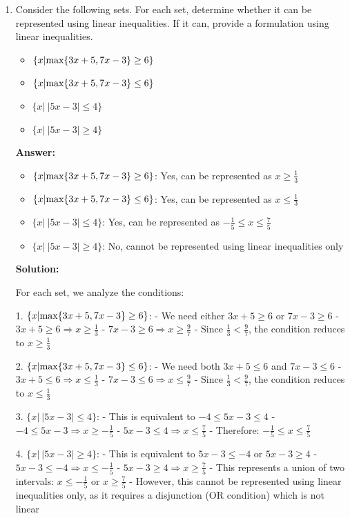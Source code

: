 \documentclass[11pt]{article}
\begin{document}
\begin{enumerate}
\item Consider the following sets. For each set, determine whether it can be represented using linear inequalities. If it can, provide a formulation using linear inequalities.
\begin{itemize}
\item $\{x | \textup{max}\{ 3x + 5, 7x - 3\} \geq 6\}$
\item $\{x | \textup{max}\{ 3x + 5, 7x - 3\} \leq 6\}$
\item $\{x| \ |5x -3| \leq 4\}$
\item $\{x| \ |5x -3| \geq 4\}$
\end{itemize}

\textbf{Answer:}

\begin{itemize}
\item $\{x | \textup{max}\{ 3x + 5, 7x - 3\} \geq 6\}$: Yes, can be represented as $x \geq \frac{1}{3}$
\item $\{x | \textup{max}\{ 3x + 5, 7x - 3\} \leq 6\}$: Yes, can be represented as $x \leq \frac{1}{3}$
\item $\{x| \ |5x -3| \leq 4\}$: Yes, can be represented as $-\frac{1}{5} \leq x \leq \frac{7}{5}$
\item $\{x| \ |5x -3| \geq 4\}$: No, cannot be represented using linear inequalities only
\end{itemize}

\textbf{Solution:}

For each set, we analyze the conditions:

1. $\{x | \textup{max}\{ 3x + 5, 7x - 3\} \geq 6\}$: 
   - We need either $3x + 5 \geq 6$ or $7x - 3 \geq 6$
   - $3x + 5 \geq 6 \Rightarrow x \geq \frac{1}{3}$
   - $7x - 3 \geq 6 \Rightarrow x \geq \frac{9}{7}$
   - Since $\frac{1}{3} < \frac{9}{7}$, the condition reduces to $x \geq \frac{1}{3}$

2. $\{x | \textup{max}\{ 3x + 5, 7x - 3\} \leq 6\}$:
   - We need both $3x + 5 \leq 6$ and $7x - 3 \leq 6$
   - $3x + 5 \leq 6 \Rightarrow x \leq \frac{1}{3}$
   - $7x - 3 \leq 6 \Rightarrow x \leq \frac{9}{7}$
   - Since $\frac{1}{3} < \frac{9}{7}$, the condition reduces to $x \leq \frac{1}{3}$

3. $\{x| \ |5x -3| \leq 4\}$:
   - This is equivalent to $-4 \leq 5x - 3 \leq 4$
   - $-4 \leq 5x - 3 \Rightarrow x \geq -\frac{1}{5}$
   - $5x - 3 \leq 4 \Rightarrow x \leq \frac{7}{5}$
   - Therefore: $-\frac{1}{5} \leq x \leq \frac{7}{5}$

4. $\{x| \ |5x -3| \geq 4\}$:
   - This is equivalent to $5x - 3 \leq -4$ or $5x - 3 \geq 4$
   - $5x - 3 \leq -4 \Rightarrow x \leq -\frac{1}{5}$
   - $5x - 3 \geq 4 \Rightarrow x \geq \frac{7}{5}$
   - This represents a union of two intervals: $x \leq -\frac{1}{5}$ or $x \geq \frac{7}{5}$
   - However, this cannot be represented using linear inequalities only, as it requires a disjunction (OR condition) which is not linear


\end{enumerate}
\end{document}
